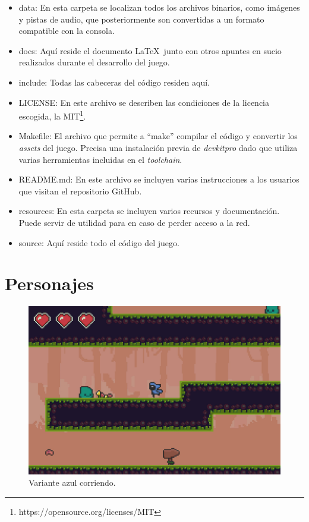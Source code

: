 \begin{itemize}
	\item data: En esta carpeta se localizan todos los archivos binarios, como imágenes y pistas de audio, que posteriormente son convertidas a un formato compatible con la consola.
	\item docs: Aquí reside el documento \LaTeX~junto con otros apuntes en sucio realizados durante el desarrollo del juego.
	\item include: Todas las cabeceras del código residen aquí.
	\item LICENSE: En este archivo se describen las condiciones de la licencia escogida, la MIT\footnote{https://opensource.org/licenses/MIT}.
	\item Makefile: El archivo que permite a ``make'' compilar el código y convertir los \textit{assets} del juego. Precisa una instalación previa de \textit{devkitpro} dado que utiliza varias herramientas incluidas en el \textit{toolchain}.
	\item README.md: En este archivo se incluyen varias instrucciones a los usuarios que visitan el repositorio GitHub.
	\item resources: En esta carpeta se incluyen varios recursos y documentación. Puede servir de utilidad para en caso de perder acceso a la red.
	\item source: Aquí reside todo el código del juego.
\end{itemize}

\section{Personajes}\label{ap:personajes}

\begin{figure}[h]
	\centering
	\includegraphics[width=.6\textwidth]{capitulos/apendice/sprites_1.png}
	\caption{Variante azul corriendo.}\label{fig:ap_sprites_1}
\end{figure}

